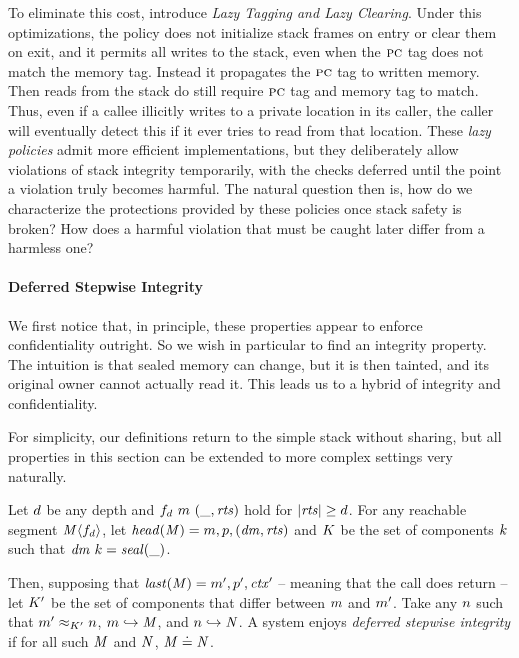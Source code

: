 \documentclass[acmsmall,review,anonymous]{acmart}\settopmatter{printfolios=true,printccs=false,printacmref=false}
\begin{document}
To eliminate this cost, \citet{DBLP:conf/sp/RoesslerD18} introduce
{\em Lazy Tagging and Lazy Clearing}. Under this optimizations,
the policy does not initialize stack frames on entry or clear them on exit,
and it permits all writes to the stack, even when the $\textsc{pc}$ tag
does not match the memory tag. Instead it propagates the \(\textsc{pc}\) tag
to written memory. Then reads from the stack do still require $\textsc{pc}$
tag and memory tag to match. Thus, even if a callee illicitly writes to
a private location in its caller, the caller will eventually detect this
if it ever tries to read from that location.
%
These \emph{lazy policies} admit more efficient implementations, but
they deliberately allow violations of stack integrity temporarily,
with the checks deferred until the point a violation truly becomes
harmful. The natural question then is, how do we characterize the
protections provided by these policies once stack safety is broken?
How does a harmful violation that must be caught later differ from a
harmless one?

\paragraph*{Deferred Stepwise Integrity}

We first notice that, in principle, these properties appear to enforce
confidentiality outright. So we wish in particular to find an integrity
property. The intuition is that sealed memory can change, but it is
then tainted, and its original owner cannot actually read it. This
leads us to a hybrid of integrity and confidentiality.

For simplicity, our definitions return to the simple stack without sharing,
but all properties in this section can be extended to more complex settings
very naturally.

 Let \(d\) be any depth and \(f_d ~ m ~ (\_, \mathit{rts})\) hold for
\(|\mathit{rts}| \geq d\). For any reachable segment \(\mathit{M} \langle f_d \rangle\),
let \(\mathit{head}(\mathit{M}) = m,p,(\mathit{dm},\mathit{rts})\) and
\(K\) be the set of components \(k\) such that \(\mathit{dm} ~ k = \mathit{seal(\_)}\).

Then, supposing that \(\mathit{last}(\mathit{M}) = m',p',\mathit{ctx}'\) -- meaning that the
call does return -- let \(K'\) be the set of components that differ
between \(m\) and \(m'\). Take any \(n\) such that
\(m' \approx_{K'} n\), \(m \hookrightarrow \mathit{M}\), and
\(n \hookrightarrow \mathit{N}\). A system enjoys
{\em deferred stepwise integrity} if for all such \(\mathit{M}\) and \(\mathit{N}\),
\(\mathit{M} \doteq \mathit{N}\).
\end{document}
